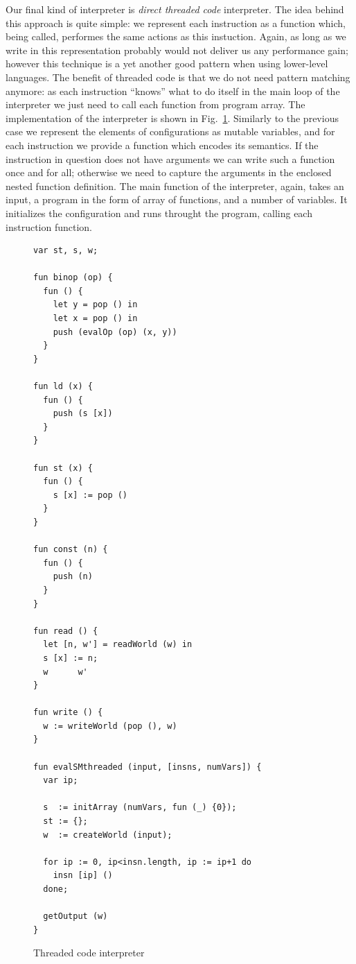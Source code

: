 Our final kind of interpreter is \emph{direct threaded code} interpreter. The idea behind this approach is quite simple: we represent each
instruction as a function which, being called, performes the same actions as this instuction. Again, as long as we write in \lama this
representation probably would not deliver us any performance gain; however this technique is a yet another good pattern when using
lower-level languages. The benefit of threaded code is that we do not need pattern matching anymore: as each instruction
``knows'' what to do itself in the main loop of the interpreter we just need to call each function from program array. The
implementation of the interpreter is shown in Fig.~\ref{threaded-interpreter}. Similarly to the previous case we
represent the elements of configurations as mutable variables, and for each instruction we provide a function which encodes its semantics.
If the instruction in question does not have arguments we can write such a function once and for all; otherwise we need to capture the arguments
in the enclosed nested function definition. The main function of the interpreter, again, takes an input, a program in the form of array of
functions, and a number of variables. It initializes the configuration and runs throught the program, calling each instruction function.

\begin{figure}
  \begin{lstlisting}[mathescape=true]
var st, s, w;
    
fun binop (op) {
  fun () {
    let y = pop () in
    let x = pop () in
    push (evalOp (op) (x, y))
  }
}

fun ld (x) {
  fun () {
    push (s [x])
  }
}

fun st (x) {
  fun () {
    s [x] := pop ()
  }
}

fun const (n) {
  fun () {
    push (n)
  }
}

fun read () {
  let [n, w'] = readWorld (w) in
  s [x] := n;
  w      w'
}

fun write () {
  w := writeWorld (pop (), w)
}

fun evalSMthreaded (input, [insns, numVars]) {
  var ip;
  
  s  := initArray (numVars, fun (_) {0});
  st := {};
  w  := createWorld (input);
  
  for ip := 0, ip<insn.length, ip := ip+1 do
    insn [ip] ()
  done;

  getOutput (w)
}
  \end{lstlisting}
  \caption{Threaded code interpreter}
  \label{threaded-interpreter}
\end{figure}

